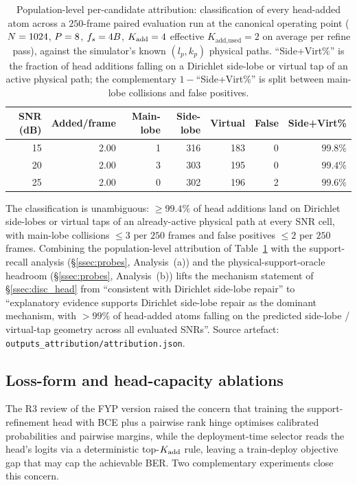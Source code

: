 \begin{table}[t]
\centering
\caption{Population-level per-candidate attribution: classification of every head-added atom across a $250$-frame paired evaluation run at the canonical operating point ($N = 1024$, $P = 8$, $f_s = 4B$, $K_{\mathrm{add}} = 4$ effective $K_\text{add,used} = 2$ on average per refine pass), against the simulator's known $(l_p, k_p)$ physical paths. ``Side+Virt\%'' is the fraction of head additions falling on a Dirichlet side-lobe or virtual tap of an active physical path; the complementary $1 -$``Side+Virt\%'' is split between main-lobe collisions and false positives.}
\label{tab:attribution}
\small
\begin{tabular}{rrrrrrr}
\toprule
SNR (dB) & Added/frame & Main-lobe & Side-lobe & Virtual & False & Side+Virt\% \\
\midrule
15 & 2.00 &  1 & 316 & 183 & 0 & $\mathbf{99.8\%}$ \\
20 & 2.00 &  3 & 303 & 195 & 0 & $\mathbf{99.4\%}$ \\
25 & 2.00 &  0 & 302 & 196 & 2 & $\mathbf{99.6\%}$ \\
\bottomrule
\end{tabular}
\end{table}

The classification is unambiguous: $\geq 99.4\%$ of head additions land on Dirichlet side-lobes or virtual taps of an already-active physical path at every SNR cell, with main-lobe collisions $\leq 3$ per $250$ frames and false positives $\leq 2$ per $250$ frames. Combining the population-level attribution of Table~\ref{tab:attribution} with the support-recall analysis (\S\ref{ssec:probes}, Analysis~(a)) and the physical-support-oracle headroom (\S\ref{ssec:probes}, Analysis~(b)) lifts the mechanism statement of \S\ref{ssec:disc_head} from ``consistent with Dirichlet side-lobe repair'' to ``explanatory evidence supports Dirichlet side-lobe repair as the dominant mechanism, with $> 99\%$ of head-added atoms falling on the predicted side-lobe / virtual-tap geometry across all evaluated SNRs''. Source artefact: \texttt{outputs\_attribution/attribution.json}.

\subsection{Loss-form and head-capacity ablations}
\label{ssec:disc_lossform}

The R3 review of the FYP version raised the concern that training the support-refinement head with BCE plus a pairwise rank hinge optimises calibrated probabilities and pairwise margins, while the deployment-time selector reads the head's logits via a deterministic top-$K_{\mathrm{add}}$ rule, leaving a train-deploy objective gap that may cap the achievable BER. Two complementary experiments close this concern.

